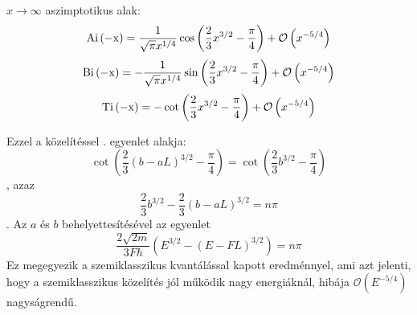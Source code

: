 $x \rightarrow \infty$ aszimptotikus alak:
	\begin{equation}
		\mathrm{Ai\left(-x\right)} = \frac{1}{\sqrt{\pi}x^{1/4}}\cos\left(\frac{2}{3}x^{3/2} - \frac{\pi}{4}\right) + \mathcal{O}\left(x^{-5/4}\right)
	\end{equation}
	\begin{equation}
		\mathrm{Bi\left(-x\right)} = -\frac{1}{\sqrt{\pi}x^{1/4}}\sin\left(\frac{2}{3}x^{3/2} - \frac{\pi}{4}\right) + \mathcal{O}\left(x^{-5/4}\right)
	\end{equation}
	\begin{equation}
		\mathrm{Ti\left(-x\right)} = -\cot\left( \frac{2}{3}x^{3/2} - \frac{\pi}{4} \right) + \mathcal{O}\left(x^{-5/4}\right)
	\end{equation}
	
	Ezzel a közelítéssel . egyenlet alakja:
	\begin{equation}
		\cot\left(\frac{2}{3}\left(b-aL\right)^{3/2} - \frac{\pi}{4}\right) = \cot\left(\frac{2}{3}b^{3/2} - \frac{\pi}{4}\right)
	\end{equation}
	, azaz
	\begin{equation}
		\frac{2}{3}b^{3/2} - \frac{2}{3}\left(b-aL\right)^{3/2} = n\pi
	\end{equation}
	. Az $a$ és $b$ behelyettesítésével az egyenlet
	\begin{equation}
		\frac{2\sqrt{2m}}{3F\hbar}\left(E^{3/2} - \left(E - FL\right)^{3/2}\right) = n\pi
	\end{equation}
	Ez megegyezik a szemiklasszikus kvantálással kapott eredménnyel, ami azt jelenti, hogy a szemiklasszikus közelítés jól működik nagy energiáknál, hibája $\mathcal{O}\left(E^{-5/4}\right)$ nagyságrendű.

